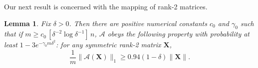 \documentclass[11pt]{article}
\newtheorem{lemma}[theorem]{Lemma}
\newcommand{\<}{\langle}
\renewcommand{\>}{\rangle}
\newcommand{\bX}{\bm{X}}
\numberwithin{equation}{section}
\newcommand{\cA}{\mathcal{A}}
\begin{document}
Our next result is concerned with the mapping of rank-2 matrices.
\begin{lemma}
  \label{lem:A2}
  Fix $\delta > 0$. Then there are positive numerical constants $c_0$
  and $\gamma_0$ such that if $m \ge c_0 \, [\delta^{-2} \log
  \delta^{-1}] \, n$, $\cA$ obeys the following property with
  probability at least $1 - 3 e^{-\gamma_0 m\delta^2}$:
  for any symmetric rank-2 matrix $\bX$,
\begin{equation}
\label{eq:A2b}
\frac{1}{m} \|\cA(\bX)\|_1 \ge 0.94 (1-\delta) \|\bX\|.  
\end{equation}
\end{lemma}
\end{document}
